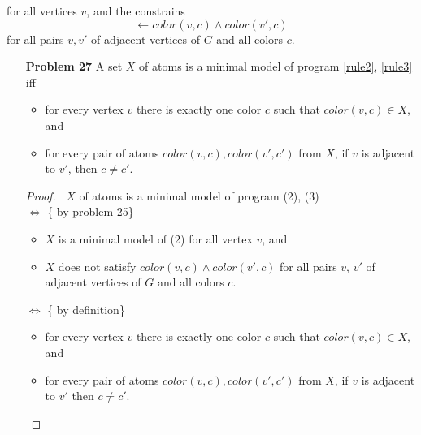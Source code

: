 for all vertices $v$, and the constrains
\begin{equation}
    \leftarrow color(v, c) \wedge color(v', c)
    \label{rule3}
\end{equation}
for all pairs $v, v'$ of adjacent vertices of $G$ and all colors $c$. 
\begin{enumerate}
\item[\textbf{Problem 27}] A set $X$ of atoms is a minimal model of program \eqref{rule2}, \eqref{rule3} iff
    \begin{itemize}
         \item for every vertex $v$ there is exactly one color $c$ such that $color(v, c) \in X$, and
         \item for every pair of atoms $color(v, c), color(v', c')$ from $X$, if $v$ is adjacent to $v'$, then $c \neq c'$.
    \end{itemize}

\begin{proof} $~$
$X$ of atoms is a minimal model of program (2), (3) \\
$\iff$  \{ by problem 25\}
	\begin{itemize}
		\item $X$ is a minimal model of (2) for all vertex $v$, and 
       \item $X$ does not satisfy $color(v,c) \wedge color(v',c)$ for all pairs $v$, $v'$ of adjacent vertices of $G$ and all colors $c$.       
	\end{itemize}
$\iff$  \{ by definition\}
	\begin{itemize}
		\item for every vertex $v$ there is exactly one color $c$ such that $color(v,c) \in X$, and 
        \item for every pair of atoms $color(v,c), color(v',c')$ from $X$, if $v$ is adjacent to $v'$ then $c \neq c'$.
    \end{itemize}
\end{proof}

\newpage



\end{enumerate}
